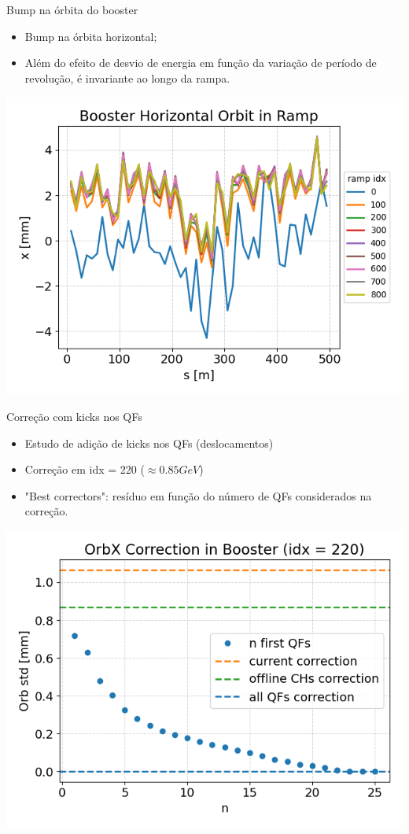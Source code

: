 \documentclass[1611]{beamer}					  %
\begin{document}
\begin{frame}{Bump na órbita do booster}
\vspace{0.5cm}
\begin{itemize}
    \item Bump na órbita horizontal;
    \item Além do efeito de desvio de energia em função da variação de período de revolução, é invariante ao longo da rampa.
\vspace{0.5cm}
\end{itemize}
\centering
    \includegraphics[scale=0.5]{2024-04-19/figures/bo-orbit.png}
\end{frame}

\begin{frame}{Correção com kicks nos QFs}
\vspace{0.5cm}
\begin{itemize}
    \item Estudo de adição de kicks nos QFs (deslocamentos)
    \item Correção em idx = 220 ($\approx 0.85 GeV$)
    \item "Best correctors": resíduo em função do número de QFs considerados na correção.
\vspace{0.5cm}
\end{itemize}
\centering
    \includegraphics[scale=0.5]{2024-04-19/figures/qfs-correction.png}
\end{frame}
\end{document}
